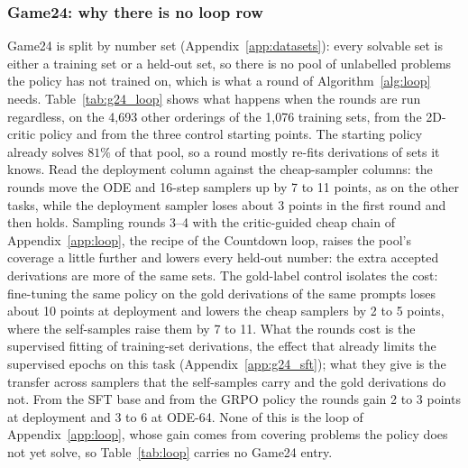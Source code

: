 \fi


\iffalse
\subsubsection{Game24: why there is no loop row}
\label{app:g24_loop}
Game24 is split by number set (Appendix~\ref{app:datasets}): every solvable set is either a training set or a held-out set, so there is no pool of unlabelled problems the policy has not trained on, which is what a round of Algorithm~\ref{alg:loop} needs. Table~\ref{tab:g24_loop} shows what happens when the rounds are run regardless, on the 4{,}693 other orderings of the 1{,}076 training sets, from the 2D-critic policy and from the three control starting points. The starting policy already solves $81\%$ of that pool, so a round mostly re-fits derivations of sets it knows. Read the deployment column against the cheap-sampler columns: the rounds move the ODE and 16-step samplers up by 7 to 11 points, as on the other tasks, while the deployment sampler loses about 3 points in the first round and then holds. Sampling rounds 3--4 with the critic-guided cheap chain of Appendix~\ref{app:loop}, the recipe of the Countdown loop, raises the pool's coverage a little further and lowers every held-out number: the extra accepted derivations are more of the same sets. The gold-label control isolates the cost: fine-tuning the same policy on the gold derivations of the same prompts loses about 10 points at deployment and lowers the cheap samplers by 2 to 5 points, where the self-samples raise them by 7 to 11. What the rounds cost is the supervised fitting of training-set derivations, the effect that already limits the supervised epochs on this task (Appendix~\ref{app:g24_sft}); what they give is the transfer across samplers that the self-samples carry and the gold derivations do not. From the SFT base and from the GRPO policy the rounds gain 2 to 3 points at deployment and 3 to 6 at ODE-64. None of this is the loop of Appendix~\ref{app:loop}, whose gain comes from covering problems the policy does not yet solve, so Table~\ref{tab:loop} carries no Game24 entry.
